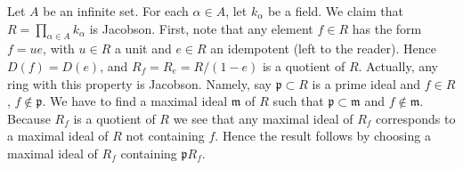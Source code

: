 \begin{example}
\label{example-infinite-product-fields-jacobson}
Let $A$ be an infinite set.
For each $\alpha \in A$, let $k_\alpha$ be a field.
We claim that $R = \prod_{\alpha\in A} k_\alpha$ is Jacobson.
First, note that any element $f \in R$ has the form
$f = ue$, with $u \in R$ a unit and $e\in R$ an idempotent
(left to the reader).
Hence $D(f) = D(e)$, and $R_f = R_e = R/(1-e)$ is a quotient of $R$.
Actually, any ring with this property is Jacobson.
Namely, say $\mathfrak p \subset R$ is a prime ideal
and $f \in R$, $f \not \in \mathfrak p$. We have to find
a maximal ideal $\mathfrak m$ of $R$ such that
$\mathfrak p \subset \mathfrak m$ and $f \not\in \mathfrak m$.
Because $R_f$ is a quotient of $R$ we see that any maximal
ideal of $R_f$ corresponds to a maximal ideal of $R$
not containing $f$. Hence the result follows
by choosing a maximal ideal of $R_f$ containing $\mathfrak p R_f$.
\end{example}